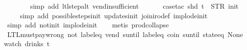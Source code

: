 \begin{isabellebody}
\ \ \ \ \ \ \isamarkupfalse%
\ {\isacharparenleft}simp\ add{\isacharcolon}\ ltl{\isacharunderscore}step{\isacharunderscore}alt\ vend{\isacharunderscore}insufficient{\isacharparenright}\isanewline
\ \ \isamarkupfalse%
\isanewline
{}\isamarkupfalse%
%
\endisatagproof
{\isafoldproof}%
%
\isadelimproof
%
\endisadelimproof
%
%
\isadelimproof
\ \ %
\endisadelimproof
%
\isatagproof
{}\isamarkupfalse%
\ {\isacharparenleft}case{\isacharunderscore}tac\ {\isachardoublequoteopen}shd\ t\ {\isacharequal}\ {\isacharparenleft}STR\ {\isacharprime}{\isacharprime}init{\isacharprime}{\isacharprime}{\isacharcomma}\ {\isacharbrackleft}{\isacharbrackright}{\isacharparenright}{\isachardoublequoteclose}{\isacharparenright}\isanewline
\ \ \ \isamarkupfalse%
\ {\isacharparenleft}simp\ add{\isacharcolon}\ possible{\isacharunderscore}steps{\isacharunderscore}init\ updates{\isacharunderscore}init\ join{\isacharunderscore}iro{\isacharunderscore}def\ implode{\isacharunderscore}init{\isacharparenright}\isanewline
\ \ \isamarkupfalse%
\ {\isacharparenleft}simp\ add{\isacharcolon}\ not{\isacharunderscore}init\ implode{\isacharunderscore}init{\isacharparenright}\isanewline
\ \ \isamarkupfalse%
\ {\isacharparenleft}metis\ prod{\isachardot}collapse{\isacharparenright}%
\endisatagproof
{\isafoldproof}%
%
\isadelimproof
%
\endisadelimproof
\isanewline
\isanewline
\isanewline
{}\isamarkupfalse%
\ LTL{\isacharunderscore}must{\isacharunderscore}pay{\isacharunderscore}wrong{\isacharcolon}\ {\isachardoublequoteopen}{\isacharparenleft}{\isacharparenleft}not\ {\isacharparenleft}label{\isacharunderscore}eq\ {\isacharprime}{\isacharprime}vend{\isacharprime}{\isacharprime}\ suntil\ label{\isacharunderscore}eq\ {\isacharprime}{\isacharprime}coin{\isacharprime}{\isacharprime}{\isacharparenright}{\isacharparenright}\ suntil\ state{\isacharunderscore}eq\ None{\isacharparenright}\ {\isacharparenleft}watch\ drinks\ t{\isacharparenright}{\isachardoublequoteclose}\isanewline

\end{isabellebody}
